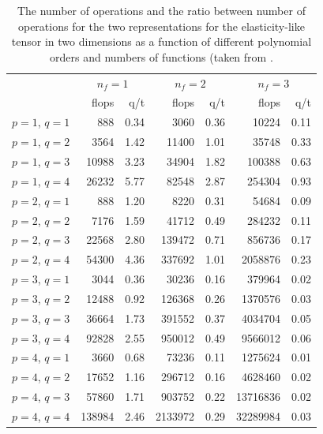 \begin{table}
  \caption{The number of operations and the ratio between number of
    operations for the two representations for the elasticity-like
    tensor in two dimensions as a function of different polynomial
    orders and numbers of functions (taken from
    \citet{OelgaardWells2010}.}
  \label{oelgaard-2:tab:elasticity2D_complex_comparison}
  \centering
  \small
  \begin{tabular}{lrrrrrr}
    \toprule
    \multicolumn{1}{c}{} & \multicolumn{2}{c}{$n_f = 1$} & \multicolumn{2}{c}{$n_f = 2$} & \multicolumn{2}{c}{$n_f = 3$}\\
    & flops & q/t          & flops & q/t          & flops & q/t\\
    \midrule
    $p = 1$, $q = 1$  &    888  &  0.34               &    3060 &  0.36               &   10224 & 0.11\\
    $p = 1$, $q = 2$  &   3564  &  1.42               &   11400 &  1.01               &   35748 & 0.33\\
    $p = 1$, $q = 3$  &  10988  &  3.23               &   34904 &  1.82               &  100388 & 0.63\\
    $p = 1$, $q = 4$  &  26232  &  5.77               &   82548 &  2.87               &  254304 & 0.93\\
    \midrule
    $p = 2$, $q = 1$  &    888  &  1.20               &    8220 &  0.31               &   54684 & 0.09\\
    $p = 2$, $q = 2$  &   7176  &  1.59               &   41712 &  0.49               &  284232 & 0.11\\
    $p = 2$, $q = 3$  &  22568  &  2.80               &  139472 &  0.71               &  856736 & 0.17\\
    $p = 2$, $q = 4$  &  54300  &  4.36               &  337692 &  1.01               & 2058876 & 0.23\\
    \midrule
    $p = 3$, $q = 1$  &   3044  &  0.36               &   30236 &  0.16               &  379964 & 0.02\\
    $p = 3$, $q = 2$  &  12488  &  0.92               &  126368 &  0.26               & 1370576 & 0.03\\
    $p = 3$, $q = 3$  &  36664  &  1.73               &  391552 &  0.37               & 4034704 & 0.05\\
    $p = 3$, $q = 4$  &  92828  &  2.55               &  950012 &  0.49               & 9566012 & 0.06\\
    \midrule
    $p = 4$, $q = 1$  &   3660  &  0.68               &   73236 &  0.11               & 1275624 & 0.01\\
    $p = 4$, $q = 2$  &  17652  &  1.16               &  296712 &  0.16               & 4628460 & 0.02\\
    $p = 4$, $q = 3$  &  57860  &  1.71               &  903752 &  0.22               &13716836 & 0.02\\
    $p = 4$, $q = 4$  & 138984  &  2.46               & 2133972 &  0.29               &32289984 & 0.03\\
    \bottomrule
  \end{tabular}
\end{table}

